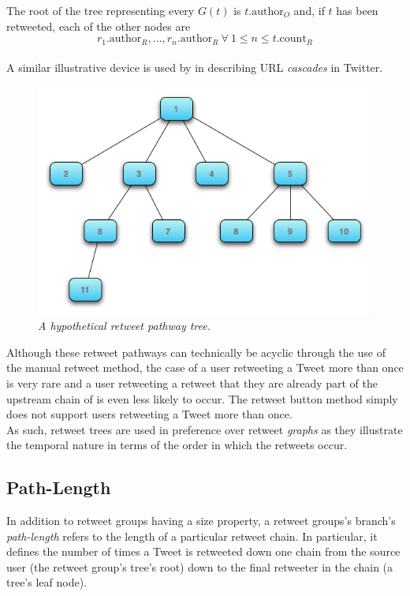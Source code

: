 The root of the tree representing every $G(t)$ is $t.\textrm{author}_O$ and, if $t$ has been retweeted, each of the other nodes are $$r_1.\textrm{author}_R, ... , r_n.\textrm{author}_R \: \forall \: 1 \leq n \leq t.\mathrm{count}_R $$\\
A similar illustrative device is used by \cite{galuba10} in describing URL \textit{cascades} in Twitter.

\begin{figure}[h]
\centering
\includegraphics[scale=0.5]{3.Chapter1/Media/tree.png} 
\caption{\textit{A hypothetical retweet pathway tree.}}
\label{fig:retweet_tree}
\end{figure}

Although these retweet pathways can technically be acyclic through the use of the manual retweet method, the case of a user retweeting a Tweet more than once is very rare and a user retweeting a retweet that they are already part of the upstream chain of is even less likely to occur. The retweet button method simply does not support users retweeting a Tweet more than once.\\
As such, retweet trees are used in preference over retweet \textit{graphs} as they illustrate the temporal nature in terms of the order in which the retweets occur.


\subsection{Path-Length}
In addition to retweet groups having a size property, a retweet groups's branch's \textit{path-length} refers to the length of a particular retweet chain. In particular, it defines the number of times a Tweet is retweeted down one chain from the source user (the retweet group's tree's root) down to the final retweeter in the chain (a tree's leaf node).


